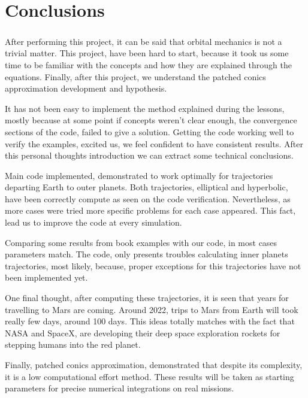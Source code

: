 \chapter{Conclusions}
\paragraph{} After performing this project, it can be said that orbital mechanics is not a trivial matter. This project, have been hard to start, because it took us some time to be familiar with the concepts and how they are explained through the equations. Finally, after this project, we understand the patched conics approximation development and hypothesis.

It has not been easy to implement the method explained during the lessons, mostly because at some point if concepts weren't clear enough, the convergence sections of the code, failed to give a solution. Getting the code working well to verify the examples, excited us, we feel confident to have consistent results. After this personal thoughts introduction we can extract some technical conclusions.

Main code implemented, demonstrated to work optimally for trajectories departing Earth to outer planets. Both trajectories, elliptical and hyperbolic, have been correctly compute as seen on the code verification. Nevertheless, as more cases were tried more specific problems for each case appeared. This fact, lead us to improve the code at every simulation.

Comparing some results from book \cite{llibreVictor} examples with our code, in most cases parameters match. The code, only presents troubles calculating inner planets trajectories, most likely, because, proper exceptions for this trajectories have not been implemented yet. 

One final thought, after computing these trajectories, it is seen that years for travelling to Mars are coming. Around 2022, trips to Mars from Earth will took really few days, around 100 days. This ideas totally matches with the fact that NASA and SpaceX, are developing their deep space exploration rockets for stepping humans into the red planet.

Finally, patched conics approximation, demonstrated that despite its complexity, it is a low computational effort method. These results will be taken as starting parameters for precise numerical integrations on real missions.